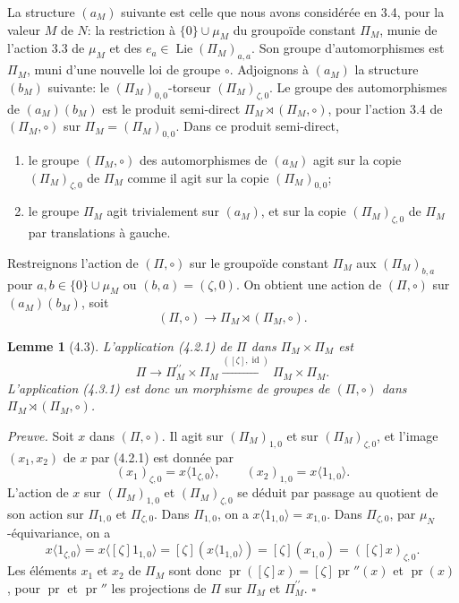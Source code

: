 \documentclass[10pt,a4paper]{article}
\newcommand{\Lie}{\operatorname{Lie}}
\newcommand{\Id}{\operatorname{id}}
\theoremstyle{deligne}
\newtheorem*{lemma*}{Lemme}
\newenvironment{proofdel}{\textit{Preuve.}}{\hfill$\square$}
\begin{document}
La structure \((a_M)\) suivante est celle que nous avons considérée en 3.4, pour la valeur \(M\) de \(N\): la restriction à \(\{0\}\cup\mu_M\) du groupoïde constant \(\Pi_M\), munie de l'action 3.3 de \(\mu_M\) et des \(e_a\in\Lie(\Pi_M)_{a,a}\). Son groupe d'automorphismes est \(\Pi_M\), muni d'une nouvelle loi de groupe \(\circ\). Adjoignons à \((a_M)\) la structure \((b_M)\) suivante: le \((\Pi_M)_{0,0}\)-torseur \((\Pi_M)_{\zeta,0}\). Le groupe des automorphismes de \((a_M)(b_M)\) est le produit semi-direct \(\Pi_M\rtimes(\Pi_M,\circ)\), pour l'action 3.4 de \((\Pi_M,\circ)\) sur \(\Pi_M=(\Pi_M)_{0,0}\). Dans ce produit semi-direct,
\begin{enumerate}[label=(\alph*'\textsubscript{\(M\)}),leftmargin=2.8em]
\item le groupe \((\Pi_M,\circ)\) des automorphismes de \((a_M)\) agit sur la copie \((\Pi_M)_{\zeta,0}\) de \(\Pi_M\) comme il agit sur la copie \((\Pi_M)_{0,0}\);
\item le groupe \(\Pi_M\) agit trivialement sur \((a_M)\), et sur la copie \((\Pi_M)_{\zeta,0}\) de \(\Pi_M\) par translations à gauche.
\end{enumerate}
Restreignons l'action de \((\Pi,\circ)\) sur le groupoïde constant \(\Pi_M\) aux \((\Pi_M)_{b,a}\) pour \(a,b\in\{0\}\cup\mu_M\) ou \((b,a)=(\zeta,0)\). On obtient une action de \((\Pi,\circ)\) sur \((a_M)(b_M)\), soit
\[
\tag{4.2.1}
(\Pi,\circ)\longrightarrow \Pi_M\rtimes(\Pi_M,\circ).
\]

\begin{lemma*}[4.3]
L'application (4.2.1) de \(\Pi\) dans \(\Pi_M\times\Pi_M\) est
\[
\tag{4.3.1}
\Pi\longrightarrow \Pi_M^{\prime\prime}\times\Pi_M
\overset{([\zeta],\Id)}{\longrightarrow}\Pi_M\times\Pi_M.
\]
L'application (4.3.1) est donc un morphisme de groupes de \((\Pi,\circ)\) dans \(\Pi_M\rtimes(\Pi_M,\circ)\).
\end{lemma*}

\begin{proofdel}
Soit \(x\) dans \((\Pi,\circ)\). Il agit sur \((\Pi_M)_{1,0}\) et sur \((\Pi_M)_{\zeta,0}\), et l'image \((x_1,x_2)\) de \(x\) par (4.2.1) est donnée par
\[
(x_1)_{\zeta,0}=x\langle 1_{\zeta,0}\rangle,\qquad
(x_2)_{1,0}=x\langle 1_{1,0}\rangle .
\]
L'action de \(x\) sur \((\Pi_M)_{1,0}\) et \((\Pi_M)_{\zeta,0}\) se déduit par passage au quotient de son action sur \(\Pi_{1,0}\) et \(\Pi_{\zeta,0}\). Dans \(\Pi_{1,0}\), on a \(x\langle 1_{1,0}\rangle=x_{1,0}\). Dans \(\Pi_{\zeta,0}\), par \(\mu_N\)-équivariance, on a
\[
x\langle 1_{\zeta,0}\rangle=x\langle[\zeta]1_{1,0}\rangle=[\zeta](x\langle1_{1,0}\rangle)=[\zeta](x_{1,0})=([\zeta]x)_{\zeta,0}.
\]
Les éléments \(x_1\) et \(x_2\) de \(\Pi_M\) sont donc \(\operatorname{pr}([\zeta]x)=[\zeta]\operatorname{pr}''(x)\) et \(\operatorname{pr}(x)\), pour \(\operatorname{pr}\) et \(\operatorname{pr}''\) les projections de \(\Pi\) sur \(\Pi_M\) et \(\Pi_M^{\prime\prime}\).
\end{proofdel}
\end{document}
